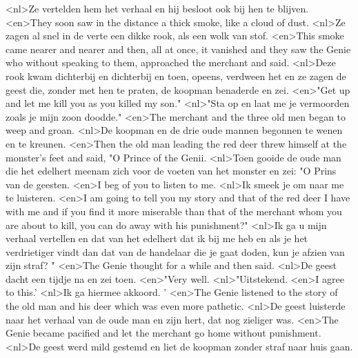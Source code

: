 <nl>Ze vertelden hem het verhaal en hij besloot ook bij hen te blijven.
<en>They soon saw in the distance a thick smoke, like a cloud of dust.
<nl>Ze zagen al snel in de verte een dikke rook, als een wolk van stof.
<en>This smoke came nearer and nearer and then, all at once, it vanished and they saw the Genie who without speaking to them, approached the merchant and said.
<nl>Deze rook kwam dichterbij en dichterbij en toen, opeens, verdween het en ze zagen de geest die, zonder met hen te praten, de koopman benaderde en zei.
<en>"Get up and let me kill you as you killed my son."
<nl>"Sta op en laat me je vermoorden zoals je mijn zoon doodde."
<en>The merchant and the three old men began to weep and groan.
<nl>De koopman en de drie oude mannen begonnen te wenen en te kreunen.
<en>Then the old man leading the red deer threw himself at the monster’s feet and said, "O Prince of the Genii.
<nl>Toen gooide de oude man die het edelhert meenam zich voor de voeten van het monster en zei: "O Prins van de geesten.
<en>I beg of you to listen to me.
<nl>Ik smeek je om naar me te luisteren.
<en>I am going to tell you my story and that of the red deer I have with me and if you find it more miserable than that of the merchant whom you are about to kill, you can do away with his punishment?"
<nl>Ik ga u mijn verhaal vertellen en dat van het edelhert dat ik bij me heb en als je het verdrietiger vindt dan dat van de handelaar die je gaat doden, kun je afzien van zijn straf? "
<en>The Genie thought for a while and then said.
<nl>De geest dacht een tijdje na en zei toen.
<en>"Very well.
<nl>"Uitstekend.
<en>I agree to this.'
<nl>Ik ga hiermee akkoord. '
<en>The Genie listened to the story of the old man and his deer which was even more pathetic.
<nl>De geest luisterde naar het verhaal van de oude man en zijn hert, dat nog zieliger was.
<en>The Genie became pacified and let the merchant go home without punishment.
<nl>De geest werd mild gestemd en liet de koopman zonder straf naar huis gaan.
